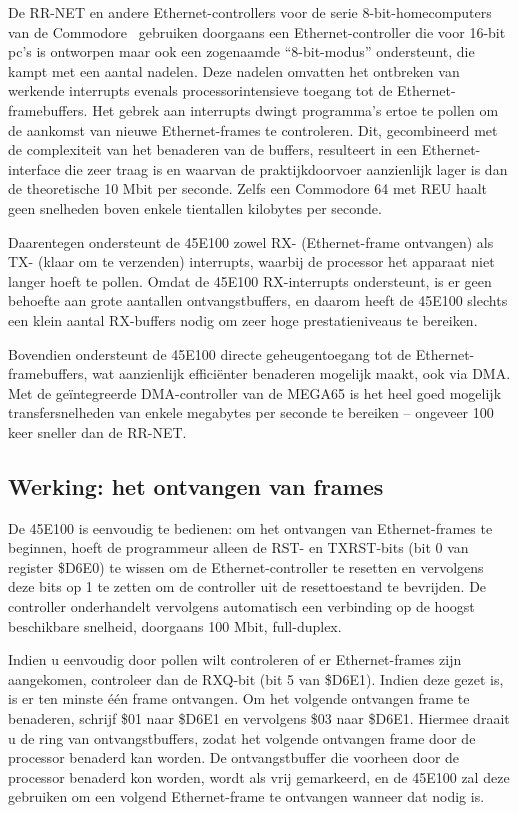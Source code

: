 De RR-NET en andere Ethernet-controllers voor de serie 8-bit-homecomputers van de Commodore\texttrademark{} \ gebruiken doorgaans een Ethernet-controller die voor 16-bit pc's is ontworpen maar ook een zogenaamde ``8-bit-modus'' ondersteunt, die kampt met een aantal nadelen. Deze nadelen omvatten het ontbreken van werkende interrupts evenals processorintensieve toegang tot de Ethernet-framebuffers. Het gebrek aan interrupts dwingt programma's ertoe te pollen om de aankomst van nieuwe Ethernet-frames te controleren. Dit, gecombineerd met de complexiteit van het benaderen van de buffers, resulteert in een Ethernet-interface die zeer traag is en waarvan de praktijkdoorvoer aanzienlijk lager is dan de theoretische 10 Mbit per seconde. Zelfs een Commodore 64 met REU haalt geen snelheden boven enkele tientallen kilobytes per seconde.

Daarentegen ondersteunt de 45E100 zowel RX- (Ethernet-frame ontvangen) als TX- (klaar om te verzenden) interrupts, waarbij de processor het apparaat niet langer hoeft te pollen. Omdat de 45E100 RX-interrupts ondersteunt, is er geen behoefte aan grote aantallen ontvangstbuffers, en daarom heeft de 45E100 slechts een klein aantal RX-buffers nodig om zeer hoge prestatieniveaus te bereiken.

Bovendien ondersteunt de 45E100 directe geheugentoegang tot de Ethernet-framebuffers, wat aanzienlijk efficiënter benaderen mogelijk maakt, ook via DMA. Met de geïntegreerde DMA-controller van de MEGA65 is het heel goed mogelijk transfersnelheden van enkele megabytes per seconde te bereiken -- ongeveer 100 keer sneller dan de RR-NET.

\subsection{Werking: het ontvangen van frames}

De 45E100 is eenvoudig te bedienen: om het ontvangen van Ethernet-frames te beginnen, hoeft de programmeur alleen de RST- en TXRST-bits (bit 0 van register \$D6E0) te wissen om de Ethernet-controller te resetten en vervolgens deze bits op 1 te zetten om de controller uit de resettoestand te bevrijden. De controller onderhandelt vervolgens automatisch een verbinding op de hoogst beschikbare snelheid, doorgaans 100 Mbit, full-duplex.

Indien u eenvoudig door pollen wilt controleren of er Ethernet-frames zijn aangekomen, controleer dan de RXQ-bit (bit 5 van \$D6E1). Indien deze gezet is, is er ten minste één frame ontvangen. Om het volgende ontvangen frame te benaderen, schrijf \$01 naar \$D6E1 en vervolgens \$03 naar \$D6E1. Hiermee draait u de ring van ontvangstbuffers, zodat het volgende ontvangen frame door de processor benaderd kan worden. De ontvangstbuffer die voorheen door de processor benaderd kon worden, wordt als vrij gemarkeerd, en de 45E100 zal deze gebruiken om een volgend Ethernet-frame te ontvangen wanneer dat nodig is.

